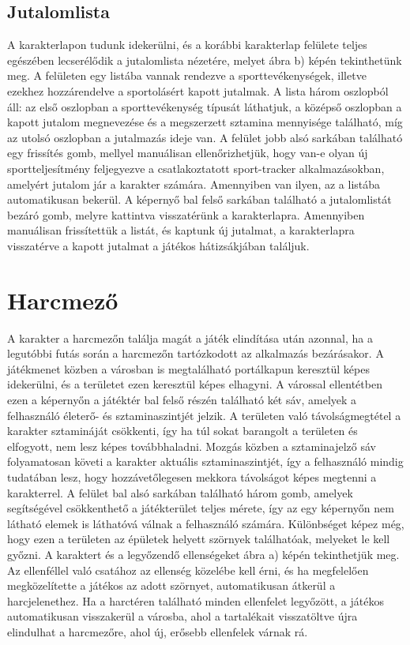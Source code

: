 \subsection*{Jutalomlista}
\label{jutalomlista}
A karakterlapon tudunk idekerülni, és a korábbi karakterlap felülete teljes egészében lecserélődik a jutalomlista nézetére, melyet  ábra b) képén tekinthetünk meg. 
A felületen egy listába vannak rendezve a sporttevékenységek, illetve ezekhez hozzárendelve a sportolásért kapott jutalmak. 
A lista három oszlopból áll: az első oszlopban a sporttevékenység típusát láthatjuk, a középső oszlopban a kapott jutalom megnevezése és a megszerzett sztamina mennyisége található, míg az utolsó oszlopban a jutalmazás ideje van. 
A felület jobb alsó sarkában található egy frissítés gomb, mellyel manuálisan ellenőrizhetjük, hogy van-e olyan új sportteljesítmény feljegyezve a csatlakoztatott sport-tracker alkalmazásokban, amelyért jutalom jár a karakter számára. 
Amennyiben van ilyen, az a listába automatikusan bekerül.
A képernyő bal felső sarkában található a jutalomlistát bezáró gomb, melyre kattintva visszatérünk a karakterlapra. 
Amennyiben manuálisan frissítettük a listát, és kaptunk új jutalmat, a karakterlapra visszatérve a kapott jutalmat a játékos hátizsákjában találjuk. 

\section{Harcmező}
\label{harcmezo}
A karakter a harcmezőn találja magát a játék elindítása után azonnal, ha a legutóbbi futás során a harcmezőn tartózkodott az alkalmazás bezárásakor. 
A játékmenet közben a városban is megtalálható portálkapun keresztül képes idekerülni, és a területet ezen keresztül képes elhagyni. 
A várossal ellentétben ezen a képernyőn a játéktér bal felső részén található két sáv, amelyek a felhasználó életerő- és sztaminaszintjét jelzik. 
A területen való távolságmegtétel a karakter sztamináját csökkenti, így ha túl sokat barangolt a területen és elfogyott, nem lesz képes továbbhaladni. 
Mozgás közben a sztaminajelző sáv folyamatosan követi a karakter aktuális sztaminaszintjét, így a felhasználó mindig tudatában lesz, hogy hozzávetőlegesen mekkora távolságot képes megtenni a karakterrel. 
A felület bal alsó sarkában található három gomb, amelyek segítségével csökkenthető a játékterület teljes mérete, így az egy képernyőn nem látható elemek is láthatóvá válnak a felhasználó számára. 
Különbséget képez még, hogy ezen a területen az épületek helyett szörnyek találhatóak, melyeket le kell győzni. 
A karaktert és a legyőzendő ellenségeket  ábra a) képén tekinthetjük meg. 
Az ellenféllel való csatához az ellenség közelébe kell érni, és ha megfelelően megközelítette a játékos az adott szörnyet, automatikusan átkerül a harcjelenethez. 
Ha a harctéren található minden ellenfelet legyőzött, a játékos automatikusan visszakerül a városba, ahol a tartalékait visszatöltve újra elindulhat a harcmezőre, ahol új, erősebb ellenfelek várnak rá. 

